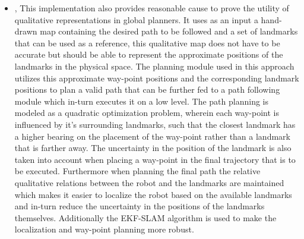 \begin{itemize}
	\item \cite{shah2011robust}, This implementation also provides reasonable cause to prove the utility of qualitative representations in global planners. It uses as an input a hand-drawn map containing the desired path to be followed and a set of landmarks that can be used as a reference, this qualitative map does not have to be accurate but should be able to represent the approximate positions of the landmarks in the physical space. The planning module used in this approach utilizes this approximate way-point positions and the corresponding landmark positions to plan a valid path that can be further fed to a path following module which in-turn executes it on a low level. The path planning is modeled as a quadratic optimization problem, wherein each way-point is influenced by it's surrounding landmarks, such that the closest landmark has a higher bearing on the placement of the way-point rather than a landmark that is farther away. The uncertainty in the position of the landmark is also taken into account when placing a way-point in the final trajectory that is to be executed. Furthermore when planning the final path the relative qualitative relations between the robot and the landmarks are maintained which makes it easier to localize the robot based on the available landmarks and in-turn reduce the uncertainty in the positions of the landmarks themselves. Additionally the EKF-SLAM algorithm is used to make the localization and way-point planning more robust.


\end{itemize}
